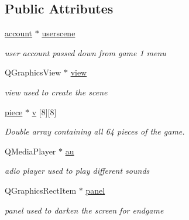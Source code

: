 \subsection*{Public Attributes}
\begin{DoxyCompactItemize}
\item 
\mbox{\label{classgame2scene_a63a51aeeb0e5d6afcc135d6e6b3673ed}} 
\hyperlink{classaccount}{account} $\ast$ \hyperlink{classgame2scene_a63a51aeeb0e5d6afcc135d6e6b3673ed}{userscene}
\begin{DoxyCompactList}\small\item\em user account passed down from game 1 menu \end{DoxyCompactList}\item 
\mbox{\label{classgame2scene_aa97a0971c7aa75079ec09827ffde1d25}} 
Q\+Graphics\+View $\ast$ \hyperlink{classgame2scene_aa97a0971c7aa75079ec09827ffde1d25}{view}
\begin{DoxyCompactList}\small\item\em view used to create the scene \end{DoxyCompactList}\item 
\mbox{\label{classgame2scene_a9e5eb644437aa33b94e9aadd0364aad7}} 
\hyperlink{classpiece}{piece} $\ast$ \hyperlink{classgame2scene_a9e5eb644437aa33b94e9aadd0364aad7}{v} \mbox{[}8\mbox{]}\mbox{[}8\mbox{]}
\begin{DoxyCompactList}\small\item\em Double array containing all 64 pieces of the game. \end{DoxyCompactList}\item 
\mbox{\label{classgame2scene_ad931a8f0808eed7e85f974669a303767}} 
Q\+Media\+Player $\ast$ \hyperlink{classgame2scene_ad931a8f0808eed7e85f974669a303767}{au}
\begin{DoxyCompactList}\small\item\em adio player used to play different sounds \end{DoxyCompactList}\item 
\mbox{\label{classgame2scene_a1c4812d12e0e31e150d2dc1d6fc8b672}} 
Q\+Graphics\+Rect\+Item $\ast$ \hyperlink{classgame2scene_a1c4812d12e0e31e150d2dc1d6fc8b672}{panel}
\begin{DoxyCompactList}\small\item\em panel used to darken the screen for endgame \end{DoxyCompactList}\item 

\end{DoxyCompactItemize}
